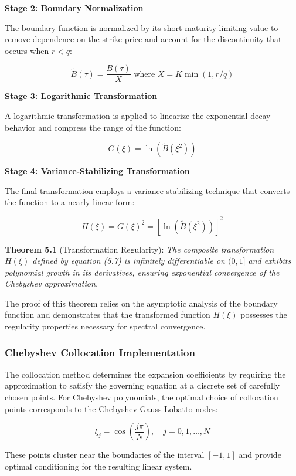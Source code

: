 \documentclass[
  11pt,
  11pt,
  letterpaper,
  onecolumn]{article}
\begin{document}
\textbf{Stage 2: Boundary Normalization}

The boundary function is normalized by its short-maturity limiting value
to remove dependence on the strike price and account for the
discontinuity that occurs when \(r < q\):

\[\widetilde{B}(\tau) = \frac{B(\tau)}{X} \text{ where } X = K \min(1, r/q) \tag{5.5}\]

\textbf{Stage 3: Logarithmic Transformation}

A logarithmic transformation is applied to linearize the exponential
decay behavior and compress the range of the function:

\[G(\xi) = \ln(\widetilde{B}(\xi^2)) \tag{5.6}\]

\textbf{Stage 4: Variance-Stabilizing Transformation}

The final transformation employs a variance-stabilizing technique that
converts the function to a nearly linear form:

\[H(\xi) = G(\xi)^2 = [\ln(\widetilde{B}(\xi^2))]^2 \tag{5.7}\]

\textbf{Theorem 5.1} (Transformation Regularity): \emph{The composite
transformation \(H(\xi)\) defined by equation (5.7) is infinitely
differentiable on \((0,1]\) and exhibits polynomial growth in its
derivatives, ensuring exponential convergence of the Chebyshev
approximation.}

The proof of this theorem relies on the asymptotic analysis of the
boundary function and demonstrates that the transformed function
\(H(\xi)\) possesses the regularity properties necessary for spectral
convergence.

\subsubsection{Chebyshev Collocation
Implementation}\label{chebyshev-collocation-implementation}

The collocation method determines the expansion coefficients by
requiring the approximation to satisfy the governing equation at a
discrete set of carefully chosen points. For Chebyshev polynomials, the
optimal choice of collocation points corresponds to the
Chebyshev-Gauss-Lobatto nodes:

\[\xi_j = \cos\left(\frac{j\pi}{N}\right), \quad j = 0, 1, \ldots, N \tag{5.8}\]

These points cluster near the boundaries of the interval \([-1,1]\) and
provide optimal conditioning for the resulting linear system.
\end{document}
